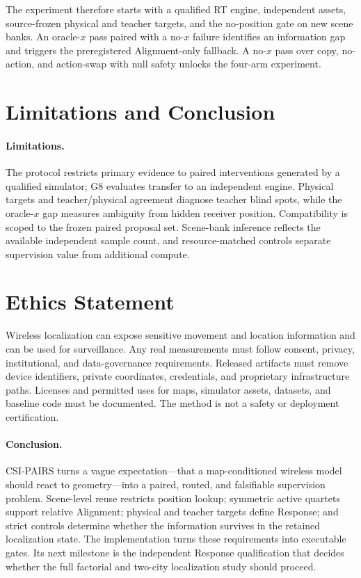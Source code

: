 \documentclass{article}
\newcommand{\method}{CSI-PAIRS}
\begin{document}
The experiment therefore starts with a qualified RT engine, independent assets,
source-frozen physical and teacher targets, and the no-position gate on new
scene banks.  An oracle-$x$ pass paired with a no-$x$ failure identifies an
information gap and triggers the preregistered Alignment-only fallback.  A
no-$x$ pass over copy, no-action, and action-swap with null safety unlocks the
four-arm experiment.

\section{Limitations and Conclusion}

\paragraph{Limitations.}
The protocol restricts primary evidence to paired interventions generated by a
qualified simulator; G8 evaluates transfer to an independent engine.  Physical
targets and teacher/physical agreement diagnose teacher blind spots, while the oracle-$x$
gap measures ambiguity from hidden receiver position.  Compatibility is scoped
to the frozen paired proposal set.  Scene-bank inference reflects the available
independent sample count, and resource-matched controls separate supervision
value from additional compute.

\section*{Ethics Statement}
Wireless localization can expose sensitive movement and location information
and can be used for surveillance.  Any real measurements must follow consent,
privacy, institutional, and data-governance requirements.  Released artifacts
must remove device identifiers, private coordinates, credentials, and
proprietary infrastructure paths.  Licenses and permitted uses for maps,
simulator assets, datasets, and baseline code must be documented.  The method
is not a safety or deployment certification.

\paragraph{Conclusion.}
\method{} turns a vague expectation---that a map-conditioned wireless model
should react to geometry---into a paired, routed, and falsifiable supervision
problem.  Scene-level reuse restricts position lookup; symmetric active
quartets support relative Alignment; physical and teacher targets define
Response; and strict controls determine whether the information survives in the
retained localization state.  The implementation turns these requirements into
executable gates.  Its next milestone is the independent Response qualification
that decides whether the full factorial and two-city localization study should
proceed.
\end{document}
